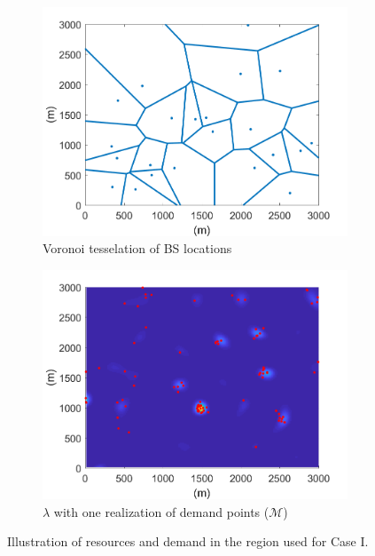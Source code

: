 \documentclass[12pt,dvipsnames]{report}
\begin{document}
\begin{figure}[htp]
	\centering
	\begin{subfigure}{.49\textwidth}
		\centering
		\includegraphics[width=1\linewidth]{Figures/CaseI_BSLocationsVoronoi}
		\caption{\small Voronoi tesselation of BS locations}
		\label{fig:CaseI_BSLocVor}
	\end{subfigure} \hfill
	\begin{subfigure}{.49\textwidth}
		\centering
		\includegraphics[width=1\linewidth]{Figures/CaseI_SSLTnsPPP_demandpointreal}
		\caption{\small $\lambda$ with one realization of demand points ($\mathcal{M}$)}
		\label{fig:CaseI_SSLTDPReal}
	\end{subfigure}
	\caption[Illustration of resources and demand used for Case I]{Illustration of resources and demand in the region used for Case I.}
	\label{fig:CaseI_NetworkArea}
\end{figure}
\end{document}
